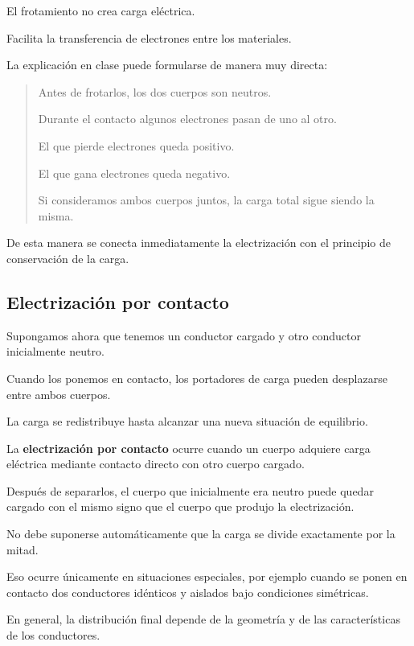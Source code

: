 \begin{idea}
El frotamiento no crea carga eléctrica.

Facilita la transferencia de electrones entre los materiales.
\end{idea}

\begin{notapedagogica}
La explicación en clase puede formularse de manera muy directa:

\begin{quote}
Antes de frotarlos, los dos cuerpos son neutros.

Durante el contacto algunos electrones pasan de uno al otro.

El que pierde electrones queda positivo.

El que gana electrones queda negativo.

Si consideramos ambos cuerpos juntos, la carga total sigue siendo la misma.
\end{quote}

De esta manera se conecta inmediatamente la electrización con el principio
de conservación de la carga.
\end{notapedagogica}



\subsection{Electrización por contacto}

Supongamos ahora que tenemos un conductor cargado y otro conductor
inicialmente neutro.

Cuando los ponemos en contacto, los portadores de carga pueden desplazarse
entre ambos cuerpos.

La carga se redistribuye hasta alcanzar una nueva situación de equilibrio.

\begin{definicion}
La \textbf{electrización por contacto} ocurre cuando un cuerpo adquiere
carga eléctrica mediante contacto directo con otro cuerpo cargado.
\end{definicion}

Después de separarlos, el cuerpo que inicialmente era neutro puede quedar
cargado con el mismo signo que el cuerpo que produjo la electrización.

\begin{advertencia}
No debe suponerse automáticamente que la carga se divide exactamente por la
mitad.

Eso ocurre únicamente en situaciones especiales, por ejemplo cuando se
ponen en contacto dos conductores idénticos y aislados bajo condiciones
simétricas.

En general, la distribución final depende de la geometría y de las
características de los conductores.
\end{advertencia}


